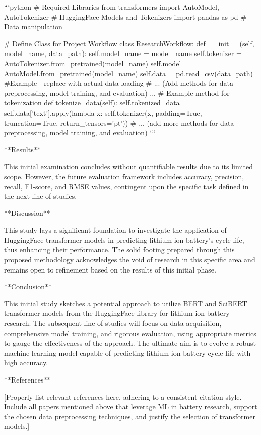 ```python
# Required Libraries
from transformers import AutoModel, AutoTokenizer  # HuggingFace Models and Tokenizers
import pandas as pd  # Data manipulation

# Define Class for Project Workflow
class ResearchWorkflow:
    def __init__(self, model_name, data_path):
        self.model_name = model_name
        self.tokenizer = AutoTokenizer.from_pretrained(model_name)
        self.model = AutoModel.from_pretrained(model_name)
        self.data = pd.read_csv(data_path) #Example - replace with actual data loading
        # ... (Add methods for data preprocessing, model training, and evaluation) ...
        # Example method for tokenization
        def tokenize_data(self):
            self.tokenized_data = self.data['text'].apply(lambda x: self.tokenizer(x, padding=True, truncation=True, return_tensors='pt'))
        # ... (add more methods for data preprocessing, model training, and evaluation)
```

**Results**

This initial examination concludes without quantifiable results due to its limited scope. However, the future evaluation framework includes accuracy, precision, recall, F1-score, and RMSE values, contingent upon the specific task defined in the next line of studies.

**Discussion**

This study lays a significant foundation to investigate the application of HuggingFace transformer models in predicting lithium-ion battery's cycle-life, thus enhancing their performance. The solid footing prepared through this proposed methodology acknowledges the void of research in this specific area and remains open to refinement based on the results of this initial phase.

**Conclusion**

This initial study sketches a potential approach to utilize BERT and SciBERT transformer models from the HuggingFace library for lithium-ion battery research. The subsequent line of studies will focus on data acquisition, comprehensive model training, and rigorous evaluation, using appropriate metrics to gauge the effectiveness of the approach. The ultimate aim is to evolve a robust machine learning model capable of predicting lithium-ion battery cycle-life with high accuracy.

**References**

[Properly list relevant references here, adhering to a consistent citation style. Include all papers mentioned above that leverage ML in battery research, support the chosen data preprocessing techniques, and justify the selection of transformer models.]

